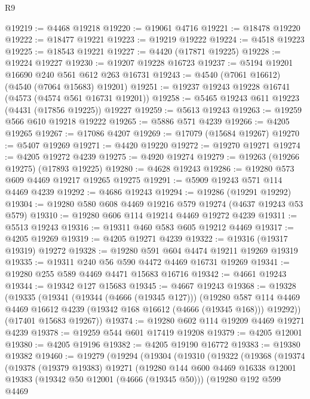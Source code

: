 \begin{lexlean}{R9}
\begin{coremodule}
@19219 := @4468 @19218
@19220 := @19061 @4716
@19221 := @18478 @19220
@19222 := @18477 @19221
@19223 := @19219 @19222
@19224 := @4518 @19223
@19225 := @18543 @19221
@19227 := @4420 (@17871 @19225)
@19228 := @19224 @19227
@19230 := @19207 @19228 @16723
@19237 := @5194 @19201 @16690 @240 @561 @612 @263 @16731
@19243 := @4540 (@7061 @16612) (@4540 (@7064 @15683) @19201)
@19251 := @19237 @19243 @19228 @16741 (@4573 (@4574 @561 @16731 @19201))
@19258 := @5465 @19243 @611 @19223 (@4431 (@17856 @19225)) @19227
@19259 := @5613 @19243
@19263 := @19259 @566 @610 @19218 @19222
@19265 := @5886 @571 @4239
@19266 := @4205 @19265
@19267 := @17086 @4207
@19269 := @17079 (@15684 @19267)
@19270 := @5407 @19269
@19271 := @4420 @19220
@19272 := @19270 @19271
@19274 := @4205 @19272 @4239
@19275 := @4920 @19274
@19279 := @19263 (@19266 @19275) (@17893 @19225)
@19280 := @4628 @19243
@19286 := @19280 @573 @609 @4469 @19217 @19265 @19275
@19291 := @5909 @19243 @571 @114 @4469 @4239
@19292 := @4686 @19243
@19294 := @19286 (@19291 @19292)
@19304 := @19280 @580 @608 @4469 @19216 @579 @19274 (@4637 @19243 @53 @579)
@19310 := @19280 @606 @114 @19214 @4469 @19272 @4239
@19311 := @5513 @19243
@19316 := @19311 @460 @583 @605 @19212 @4469
@19317 := @4205 @19269
@19319 := @4205 @19271 @4239
@19322 := @19316 (@19317 @19319) @19272
@19328 := @19280 @591 @604 @4474 @19211 @19269 @19319
@19335 := @19311 @240 @56 @590 @4472 @4469 @16731 @19269
@19341 := @19280 @255 @589 @4469 @4471 @15683 @16716
@19342 := @4661 @19243
@19344 := @19342 @127 @15683
@19345 := @4667 @19243
@19368 := @19328
    (@19335
      (@19341
        (@19344 (@4666 (@19345 @127)))
        (@19280
          @587
          @114
          @4469
          @4469
          @16612
          @4239
          (@19342 @168 @16612 (@4666 (@19345 @168)))
          @19292))
      (@17401 @15683 @19267))
@19374 := @19280 @602 @114 @19209 @4469 @19271 @4239
@19378 := @19259 @544 @601 @17419 @19208
@19379 := @4205 @12001
@19380 := @4205 @19196
@19382 := @4205 @19190 @16772
@19383 := @19380 @19382
@19460 := @19279
    (@19294
      (@19304
        (@19310
          (@19322
            (@19368
              (@19374
                (@19378
                  (@19379 @19383)
                  @19271
                  (@19280
                    @144
                    @600
                    @4469
                    @16338
                    @12001
                    @19383
                    (@19342 @50 @12001 (@4666 (@19345 @50)))
                    (@19280
                      @192
                      @599
                      @4469

\end{coremodule}
\end{lexlean}
